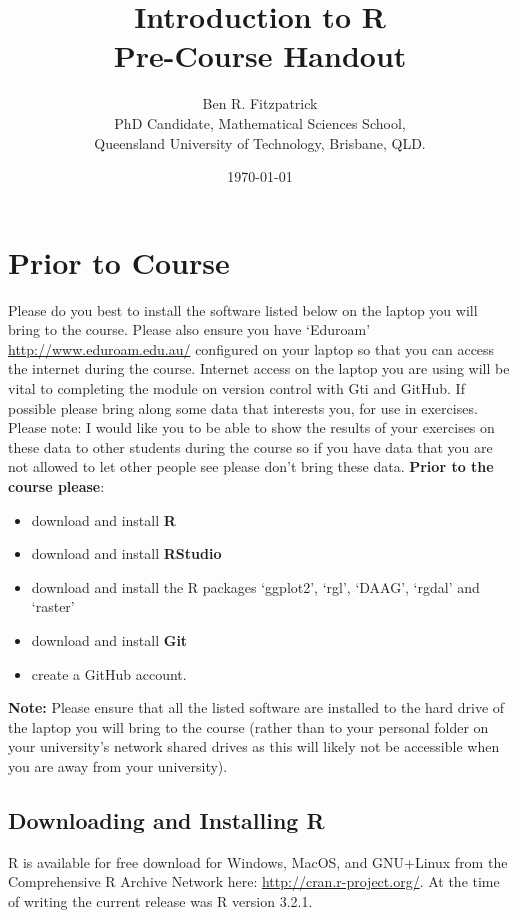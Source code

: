 \documentclass{article}[12pt]
\begin{document}
\title{\huge Introduction to R \\
 \large Pre-Course Handout}


\author{Ben R. Fitzpatrick\\ 
\small PhD Candidate, Mathematical Sciences School,\\
\small Queensland University of Technology, Brisbane, QLD.}
\date{\today}
\maketitle

\section*{Prior to Course}
Please do you best to install the software listed below on the laptop you will bring to the course.
Please also ensure you have `Eduroam' \url{http://www.eduroam.edu.au/} configured on your laptop so that you can access the internet during the course.  
Internet access on the laptop you are using will be vital to completing the module on version control with Gti and GitHub.
If possible please bring along some data that interests you, for use in exercises.
Please note: I would like you to be able to show the results of your exercises on these data to other students during the course so if you have data that you are not allowed to let other people see please don't bring these data.
\newline
\newline
\textbf{Prior to the course please}: \begin{itemize}
\item download and install \textbf{R}
\item download and install \textbf{RStudio}
\item download and install the R packages `ggplot2', `rgl', `DAAG', `rgdal' and `raster'
\item download and install \textbf{Git}
\item create a GitHub account. \end{itemize}

\textbf{Note:} Please ensure that all the listed software are installed to the hard drive of the laptop you will bring to the course (rather than to your personal folder on your university's network shared drives as this will likely not be accessible when you are away from your university).

\subsection*{Downloading and Installing R}
R is available for free download for Windows, MacOS, and GNU+Linux from the Comprehensive R Archive Network here: \url{http://cran.r-project.org/}.  At the time of writing the current release was R version 3.2.1.
\end{document}
